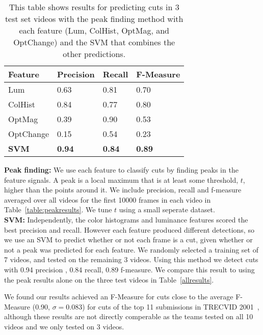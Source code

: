 \begin{table}[h!]
  \begin{center}
  	\small{
	\begin{tabular}{l|lll}
	Feature   & Precision  & Recall     & F-Measure  \\ \hline
	Lum       & 0.63      & 0.81   & 0.70      \\
	ColHist   & 0.84      & 0.77   & 0.80      \\
	OptMag    & 0.39      & 0.90   & 0.53      \\
	OptChange & 0.15      & 0.54   & 0.23      \\
	\textbf{SVM} & \textbf{0.94} & \textbf{0.84} & \textbf{0.89}\\ \hline
	\end{tabular}
	}
  \end{center}
  \label{table:allresults}
  \caption{This table shows results for predicting cuts in 3 test set videos with the peak finding method with each feature (Lum, ColHist, OptMag, and OptChange) and the SVM that combines the other predictions.}
\end{table} 

\noindent \textbf{Peak finding:} We use each feature to classify cuts by finding peaks in the feature signals. A peak is a local maximum that is at least some threshold, $t$, higher than the points around it. We include precision, recall and f-measure averaged over all videos for the first 10000 frames in each video in Table~\ref{table:peakresults}. We tune $t$ using a small seperate dataset.\\

\noindent \textbf{SVM:} Independently, the color histograms and luminance features scored the best precision and recall. However each feature produced different detections, so we use an SVM to predict whether or not each frame is a cut, given whether or not a peak was predicted for each feature. We randomly selected a training set of 7 videos, and tested on the remaining 3 videos. Using this method we detect cuts with 0.94 precision , 0.84 recall, 0.89 f-measure. We compare this result to using the peak results alone on the three test videos in Table~\ref{allresults}. 

We found our results achieved an F-Measure for cuts close to the average F-Measure (0.90, $\sigma = 0.083$) for cuts of the top 11 submissions in TRECVID 2001~\cite{quenot2001trec}, although these results are not directly comperable as the teams tested on all 10 videos and we only tested on 3 videos. 

